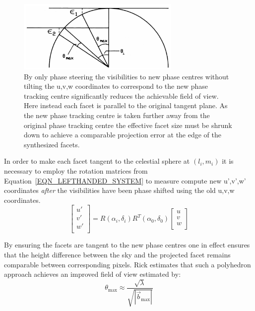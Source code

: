 \begin{figure}[h]
  \begin{mdframed}
    \centering
    \includegraphics[width=0.7\textwidth]{images/non_rotated_faceting.png}
    \caption[Faceting without regard of tangency]{By only phase steering the visibilities to new phase centres without tilting the u,v,w coordinates
    to correspond to the new phase tracking centre significantly reduces the achievable field of view. Here instead each facet is parallel to the 
    original tangent plane. As the new phase tracking centre is taken further away from the original phase tracking centre the effective facet size must be
    shrunk down to achieve a comparable projection error at the edge of the synthesized facets.}
    \label{fig_non_rotated_facets}
  \end{mdframed}
\end{figure}

In order to make each facet tangent to the celestial sphere at $(l_i,m_i)$ it is necessary to employ the rotation matrices from Equation~\ref{EQN_LEFTHANDED_SYSTEM}
to measure compute new u',v',w' coordinates \emph{after} the visibilities have been phase shifted using the old u,v,w coordinates.
\begin{equation}
 \left[\begin{array}{c}
	u'\\
	v'\\
	w'\\
       \end{array} \right] = R(\alpha_i,\delta_i)R^{T}(\alpha_0,\delta_0)\left[\begin{array}{c}
										u\\
										v \\
										w \\
									      \end{array}
									\right]
\end{equation}

By ensuring the facets are tangent to the new phase centres one in effect ensures that the height difference between the sky and the projected facet remains
comparable between corresponding pixels. Rick estimates that such a polyhedron approach achieves an improved field of view estimated by:
\begin{equation}
 \theta_{\text{max}} \approx \frac{\sqrt{\lambda}}{\sqrt{|\vec{b}_{\text{max}}|}}
\end{equation}
